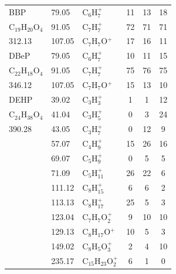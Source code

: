 {{\begin{longtable}[c]{lllccc}
\hline
BBP       & 79.05                & C$_6$H$_7^+$                           & 11           & 13           & 18           \\
C$_{19}$H$_{20}$O$_4$          & 91.05                & C$_7$H$_7^+$                           & 72           & 71           & 71           \\
312.13          & 107.05               & C$_7$H$_7$O$^+$                          & 17           & 16           & 11           \\
\hline
DBeP      & 79.05                & C$_6$H$_7^+$                           & 10           & 11           & 15           \\
C$_{22}$H$_{18}$O$_4$          & 91.05                & C$_7$H$_7^+$                           & 75           & 76           & 75           \\
346.12          & 107.05               & C$_7$H$_7$O$^+$                          & 15           & 13           & 10          \\
\hline
DEHP  & 39.02  & C$_3$H$_3^+$                     & 1  & 1  & 12 \\
C$_{24}$H$_{38}$O$_4$  & 41.04  & C$_3$H$_5^+$                     & 0  & 3  & 24 \\
390.28  & 43.05  & C$_3$H$_7^+$                     & 0  & 12 & 9  \\
 & 57.07  & C$_4$H$_9^+$                     & 15 & 26 & 16 \\
 & 69.07  & C$_5$H$_9^+$                     & 0  & 5  & 5  \\
 & 71.09  & C$_5$H$_{11}^+$                    & 26 & 22 & 6  \\
 & 111.12 & C$_8$H$_{15}^+$                    & 6  & 6  & 2  \\
 & 113.13 & C$_8$H$_{17}^+$                    & 25 & 5  & 3  \\
 & 123.04 & C$_7$H$_7$O$_2^+$   & 9  & 10 & 10 \\
 & 129.13 & C$_8$H$_{17}$O$^+$                   & 10 & 5  & 3  \\
 & 149.02 & C$_8$H$_5$O$_3^+$   & 2  & 4  & 10 \\
 & 235.17 & C$_{15}$H$_{23}$O$_2^+$ & 6  & 1  & 0  \\
\hline
\end{longtable}  

} %
}%








